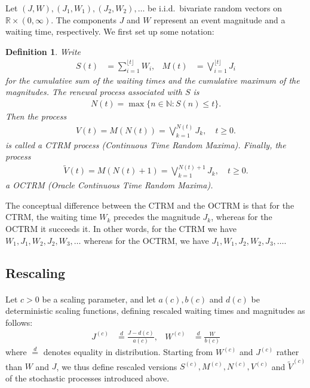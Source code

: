 \documentclass[12pt, a4paper]{article}
\newtheorem{definition}[equation]{Definition}
\newcommand{\1}{\mathbf 1}
\begin{document}
Let $(J,W),(J_1,W_1),(J_2,W_2), \ldots$ 
be i.i.d.\ bivariate random vectors on $\mathbb R \times (0, \infty)$. 
The components $J$ and $W$ represent an event magnitude and 
a waiting time, respectively. 
We first set up some notation: 


\begin{definition}
Write 
\begin{align}
S(t) &= \sum_{i=1}^{\lfloor t \rfloor} W_i, 
&
M(t) &= \bigvee_{i=1}^{\lfloor t \rfloor} J_i
\end{align} 
for the cumulative sum of the waiting times and the cumulative maximum of the 
magnitudes. 
The renewal process associated with $S$ is 
\begin{align} \label{eq:renewal-process}
N(t) = \max\{n \in \mathbb N: S(n) \le t\}.
\end{align}
Then the process
\begin{align}
V(t) 
= M\left( N(t) \right) 
= \bigvee_{k=1}^{N(t)} J_k, \quad t \ge 0.
\end{align}
is called a CTRM process (Continuous Time Random Maxima). Finally, the process
\begin{align}
\tilde V(t) 
= M\left( N(t) + 1 \right) 
= \bigvee_{k=1}^{N(t) + 1} J_k, \quad t \ge 0.
\end{align}
a OCTRM (Oracle Continuous Time Random Maxima).
\end{definition}

The conceptual difference between the CTRM and the OCTRM is that for the CTRM, 
the waiting time $W_k$ precedes the magnitude $J_k$, whereas for 
the OCTRM it succeeds it. In other words, for the CTRM we have 
$W_1, J_1, W_2, J_2, W_3, \ldots$ whereas for the
OCTRM, we have $J_1, W_1, J_2, W_2, J_3, \ldots$. 


\subsection{Rescaling}

\paragraph{}
Let $c > 0$ be a scaling parameter, and let 
$a(c), b(c)$ and $d(c)$ be deterministic scaling functions,
defining rescaled waiting times and magnitudes as follows: 
\begin{align}
J^{(c)} &\stackrel{d}{=} \frac{J - d(c)}{a(c)}, 
& 
W^{(c)} &\stackrel{d}{=} \frac{W}{b(c)}
\end{align}
where $\stackrel{d}{=}$ denotes equality in distribution. 
Starting from $W^{(c)}$ and $J^{(c)}$ rather than $W$ and $J$, we thus define rescaled 
versions $S^{(c)}, M^{(c)}, N^{(c)}, V^{(c)}$ and $\tilde V^{(c)}$ of the 
stochastic processes introduced above. 
\end{document}
